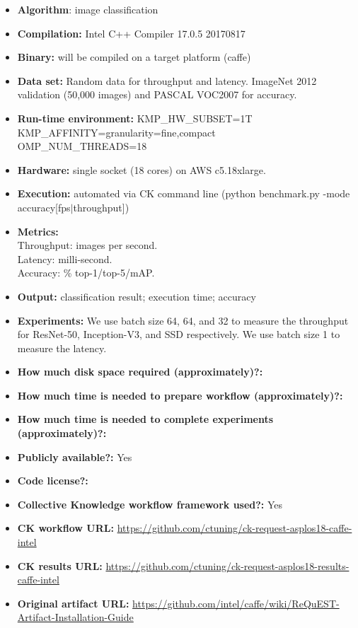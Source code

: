 \documentclass[sigplan]{acmart}
\begin{document}
\begin{itemize}
  \item {\bf Algorithm}: image classification
  \item {\bf Compilation: } Intel C++ Compiler 17.0.5 20170817
  \item {\bf Binary: } will be compiled on a target platform (caffe)
  \item {\bf Data set: } Random data for throughput and latency. ImageNet 2012 validation (50,000 images) and PASCAL VOC2007 for accuracy.
  \item {\bf Run-time environment: }
  KMP\_HW\_SUBSET=1T \\
  KMP\_AFFINITY=granularity=fine,compact \\
  OMP\_NUM\_THREADS=18
  \item {\bf Hardware: } single socket (18 cores) on AWS c5.18xlarge.
  \item {\bf Execution: } automated via CK command line (python benchmark.py -mode \newline accuracy[fps$|$throughput])
  \item {\bf Metrics: } \\ Throughput: images per second. \\ Latency: milli-second. \\ Accuracy: \% top-1/top-5/mAP.
  \item {\bf Output: } classification result; execution time; accuracy
  \item {\bf Experiments: } We use batch size 64, 64, and 32 to measure the throughput for ResNet-50, Inception-V3, and SSD respectively. We use batch size 1 to measure the latency.
  \item {\bf How much disk space required (approximately)?:} 
  \item {\bf How much time is needed to prepare workflow (approximately)?:} 
  \item {\bf How much time is needed to complete experiments (approximately)?:}
  \item {\bf Publicly available?:} Yes
  \item {\bf Code license?:} 
  \item {\bf Collective Knowledge workflow framework used?:} Yes
  \item {\bf CK workflow URL:} \url{https://github.com/ctuning/ck-request-asplos18-caffe-intel}
  \item {\bf CK results URL:} \url{https://github.com/ctuning/ck-request-asplos18-results-caffe-intel}
  \item {\bf Original artifact URL:} \url{https://github.com/intel/caffe/wiki/ReQuEST-Artifact-Installation-Guide}

\end{itemize}
\end{document}

